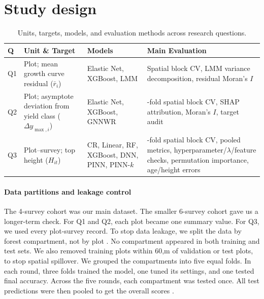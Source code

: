 \documentclass[logo,msc,ai]{infthesis}           %
\begin{document}
\section{Study design}
\begin{table}[H]
\centering
\footnotesize
\renewcommand{\arraystretch}{1.1}
\setlength{\tabcolsep}{5pt}
\begin{tabularx}{\linewidth}{@{} l >{\hsize=0.85\hsize\raggedright\arraybackslash}X >{\hsize=0.85\hsize\raggedright\arraybackslash}X >{\hsize=1.3\hsize\raggedright\arraybackslash}X @{}}
\toprule
\textbf{Q} & \textbf{Unit \& Target} & \textbf{Models} & \textbf{Main Evaluation} \\
\midrule
Q1 & Plot; mean growth curve residual ($\bar r_i$) & Elastic Net, XGBoost, LMM & Spatial block CV, LMM variance decomposition, residual Moran's $I$ \\
\addlinespace[3pt]
Q2 & Plot; asymptote deviation from yield class ($\Delta y_{\max,i}$) & Elastic Net, XGBoost, GNNWR & 5-fold spatial block CV, SHAP attribution, Moran's $I$, target audit \\
\addlinespace[3pt]
Q3 & Plot--survey; top height ($H_{it}$) & CR, Linear, RF, XGBoost, DNN, PINN, PINN-$k$ & 5-fold spatial block CV, pooled metrics, hyperparameter/$\lambda$/feature checks, permutation importance, age/height errors \\
\bottomrule
\end{tabularx}
\caption{\footnotesize Units, targets, models, and evaluation methods across research questions.}
\label{tab:rq-framework}
\end{table}

\paragraph*{Data partitions and leakage control}
The 4-survey cohort was our main dataset. The smaller 6-survey cohort gave us a longer-term check. For Q1 and Q2, each plot became one summary value. For Q3, we used every plot-survey record. To stop data leakage, we split the data by forest compartment, not by plot \cite{roberts2017Cross_C5_EVAL}. No compartment appeared in both training and test sets. We also removed training plots within 60,m of validation or test plots, to stop spatial spillover. We grouped the compartments into five equal folds. In each round, three folds trained the model, one tuned its settings, and one tested final accuracy. Across the five rounds, each compartment was tested once. All test predictions were then pooled to get the overall scores \cite{ploton2020Spatial_C5_EVAL}.
  
\end{document}
